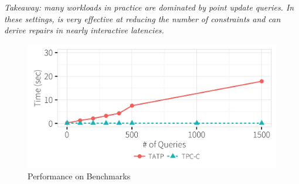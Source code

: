 {\it Takeaway: many workloads in practice are dominated by point update queries.  In these settings,
 \sys is very effective at reducing the number of constraints and can derive repairs in nearly
 interactive latencies.}
\begin{figure}[h]
\centering
  \includegraphics[width = .75\columnwidth]{figures/benchmark_time}
  \vspace*{-.2in}
  \caption{Performance on Benchmarks}
  \label{f:tpcctatp} 
  \vspace*{-.1in}
\end{figure}
\iffalse  

